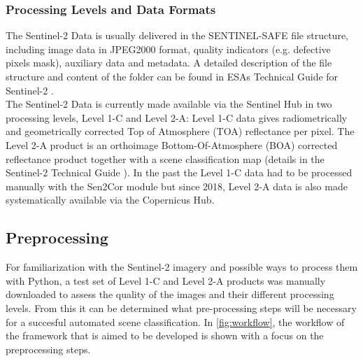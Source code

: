 \documentclass[12pt]{article}
\begin{document}
\subsubsection{Processing Levels and Data Formats}
The Sentinel-2 Data is usually delivered in the SENTINEL-SAFE file structure, including image data in JPEG2000 format, quality indicators (e.g. defective pixels mask), auxiliary data and metadata. A detailed description of the file structure and content of the folder can be found in ESAs Technical Guide for Sentinel-2 \cite{SentinelHandbook2015}.\\
The Sentinel-2 Data is currently made available via the Sentinel Hub in two processing levels, Level 1-C and Level 2-A: Level 1-C data gives radiometrically and geometrically corrected Top of Atmosphere (TOA) reflectance per pixel. The Level 2-A product is an orthoimage Bottom-Of-Atmosphere (BOA) corrected reflectance product together with a scene classification map (details in the Sentinel-2 Technical Guide \cite{SentinelHandbook2015}). In the past the Level 1-C data had to be processed manually with the Sen2Cor module \cite{Issue2018} but since 2018, Level 2-A data is also made systematically available via the Copernicus Hub.

\subsection{Preprocessing}
\label{Methodology}
For familiarization with the Sentinel-2 imagery and possible ways to process them with Python, a test set of Level 1-C and Level 2-A products was manually downloaded to assess the quality of the images and their different processing levels. From this it can be determined what pre-processing steps will be necessary for a succesful automated scene classification. In \ref{fig:workflow}, the workflow of the framework that is aimed to be developed is shown with a focus on the preprocessing steps.
\end{document}
